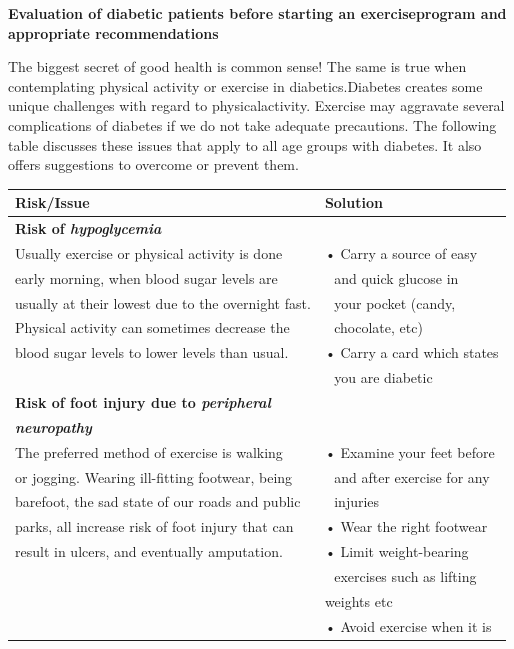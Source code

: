 \noindent\textbf{Evaluation of diabetic patients before starting an exercise\break program and appropriate recommendations}

\vskip 10pt

The biggest secret of good health is common sense! The same is true when contemplating physical activity or exercise in diabetics.\break Diabetes creates some unique challenges with regard to physical\break activity. Exercise may aggravate several complications of diabetes if we do not take adequate precautions. The following table discusses these issues that apply to all age groups with diabetes. It also offers suggestions to overcome or prevent them.

\clearpage
{
\small\addtolength{\tabcolsep}{-5pt}
\begin{longtable}{|l|l|}
\hline
\qquad\qquad\qquad\qquad\textbf{Risk/Issue} & \qquad\qquad\textbf{Solution}\\
\hline
\textbf{Risk of \textit{hypoglycemia}} & \\
Usually exercise or physical activity is done & • Carry a source of easy\\
early morning, when blood sugar levels are & \,\, and quick glucose in\\
usually at their lowest due to the overnight fast. & \,\, your pocket (candy,\\
Physical activity can sometimes decrease the & \,\, chocolate, etc)\\
blood sugar levels to lower levels than usual. & • Carry a card which states\\
 & \,\, you are diabetic\\
\hline
\textbf{Risk of foot injury due to \textit{peripheral}} & \\
\textbf{\textit{neuropathy}} & \\
The preferred method of exercise is walking & • Examine your feet before\\
or jogging. Wearing ill-fitting footwear, being & \,\, and after exercise for any\\
barefoot, the sad state of our roads and public & \,\, injuries\\
parks, all increase risk of foot injury that can & • Wear the right footwear\\
result in ulcers, and eventually amputation. & • Limit weight-bearing\\
 & \,\, exercises such as lifting\\
 & weights etc\\
 & • Avoid exercise when it is\\

\end{longtable}}
